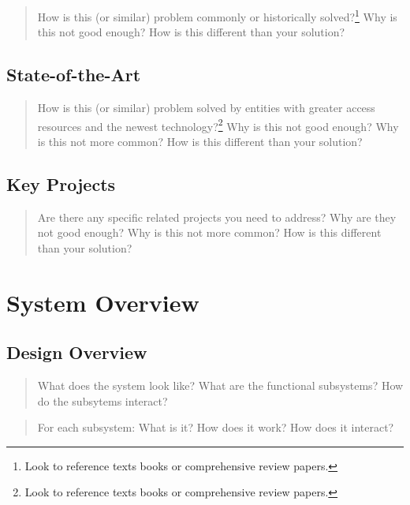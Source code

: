 \documentclass[
  10pt,
  draftcls,
  technote,
  letterpaper,
  oneside,
  onecolumn]{IEEEtran}
\begin{document}
\begin{quote}
How is this (or similar) problem commonly or historically
solved?\footnote{Look to reference texts books or comprehensive review
  papers.} Why is this not good enough? How is this different than your
solution?
\end{quote}

\hypertarget{state-of-the-art}{%
\subsection{State-of-the-Art}\label{state-of-the-art}}

\begin{quote}
How is this (or similar) problem solved by entities with greater access
resources and the newest technology?\footnote{Look to reference texts
  books or comprehensive review papers.} Why is this not good enough?
Why is this not more common? How is this different than your solution?
\end{quote}

\hypertarget{key-projects}{%
\subsection{Key Projects}\label{key-projects}}

\begin{quote}
Are there any specific related projects you need to address? Why are
they not good enough? Why is this not more common? How is this different
than your solution?
\end{quote}

\hypertarget{system-overview}{%
\section{System Overview}\label{system-overview}}

\hypertarget{design-overview}{%
\subsection{Design Overview}\label{design-overview}}

\begin{quote}
What does the system look like? What are the functional subsystems? How
do the subsytems interact?
\end{quote}

\begin{quote}
For each subsystem: What is it? How does it work? How does it interact?
\end{quote}
\end{document}
